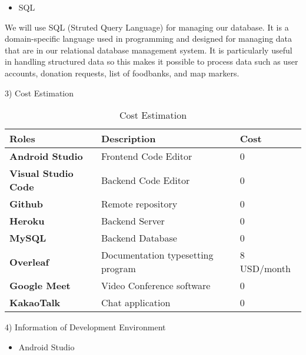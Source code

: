 \documentclass[conference]{IEEEtran}
\begin{document}
\begin{itemize}
\item SQL\\
\end{itemize}
\par We will use SQL (Struted Query Language) for managing our database.  It is a domain-specific language used in programming and designed for managing data that are in our relational database management system. It is particularly useful in handling structured data so this makes it possible to process data such as user accounts, donation requests, list of foodbanks, and map markers.\\

\newpage

3) Cost Estimation

\begin{table}[htbp]
\caption{Cost Estimation}
\begin{center}
\begin{tabular}{ | m{5em} | m{4cm}| m{2cm} | } 
  \hline
 \textbf{Roles}& \textbf{Description} & \textbf{Cost} \\
\hline
  \textbf{Android Studio} & Frontend Code Editor & 0\\
  \hline
  \textbf{Visual Studio Code} &  Backend Code Editor & 0	\\
  \hline
  \textbf{Github} & Remote repository& 0\\ 
  \hline
  \textbf{Heroku} & Backend Server & 0	\\
  \hline
  \textbf{MySQL} & Backend Database & 0	\\
  \hline
  \textbf{Overleaf} & Documentation typesetting program & 8 USD/month\\
  \hline
  \textbf{Google Meet} &Video Conference software& 0	\\
  \hline
  \textbf{KakaoTalk} &Chat application& 0	\\
  \hline
\end{tabular}
\end{center}
\end{table}

4) Information of Development Environment\\
\begin{itemize}
\item Android Studio
\end{itemize}
\end{document}
